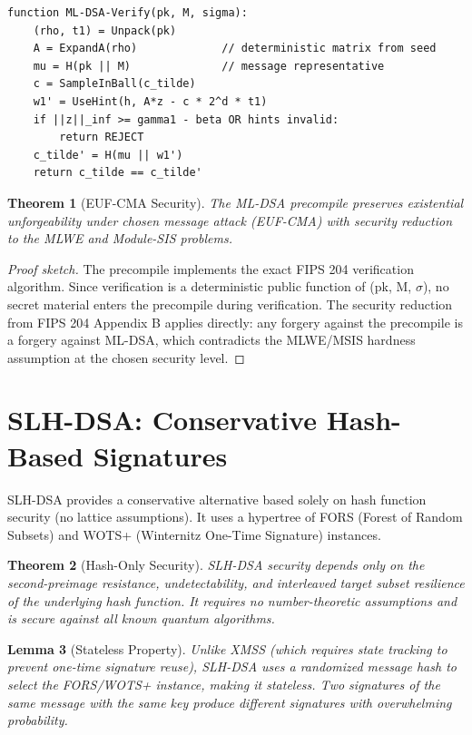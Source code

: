 \documentclass[11pt,letterpaper]{article}
\newtheorem{theorem}{Theorem}
\newtheorem{lemma}[theorem]{Lemma}
\begin{document}
\begin{lstlisting}[basicstyle=\ttfamily\small,frame=single,caption={ML-DSA Verify (Precompile)}]
function ML-DSA-Verify(pk, M, sigma):
    (rho, t1) = Unpack(pk)
    A = ExpandA(rho)             // deterministic matrix from seed
    mu = H(pk || M)              // message representative
    c = SampleInBall(c_tilde)
    w1' = UseHint(h, A*z - c * 2^d * t1)
    if ||z||_inf >= gamma1 - beta OR hints invalid:
        return REJECT
    c_tilde' = H(mu || w1')
    return c_tilde == c_tilde'
\end{lstlisting}

\begin{theorem}[EUF-CMA Security]
The ML-DSA precompile preserves existential unforgeability under chosen message attack (EUF-CMA) with security reduction to the MLWE and Module-SIS problems.
\end{theorem}

\begin{proof}[Proof sketch]
The precompile implements the exact FIPS 204 verification algorithm. Since verification is a deterministic public function of (pk, M, $\sigma$), no secret material enters the precompile during verification. The security reduction from FIPS 204 Appendix B applies directly: any forgery against the precompile is a forgery against ML-DSA, which contradicts the MLWE/MSIS hardness assumption at the chosen security level.
\end{proof}

\section{SLH-DSA: Conservative Hash-Based Signatures}

SLH-DSA provides a conservative alternative based solely on hash function security (no lattice assumptions). It uses a hypertree of FORS (Forest of Random Subsets) and WOTS+ (Winternitz One-Time Signature) instances.

\begin{theorem}[Hash-Only Security]
SLH-DSA security depends only on the second-preimage resistance, undetectability, and interleaved target subset resilience of the underlying hash function. It requires no number-theoretic assumptions and is secure against all known quantum algorithms.
\end{theorem}

\begin{lemma}[Stateless Property]
Unlike XMSS (which requires state tracking to prevent one-time signature reuse), SLH-DSA uses a randomized message hash to select the FORS/WOTS+ instance, making it stateless. Two signatures of the same message with the same key produce different signatures with overwhelming probability.
\end{lemma}
\end{document}

